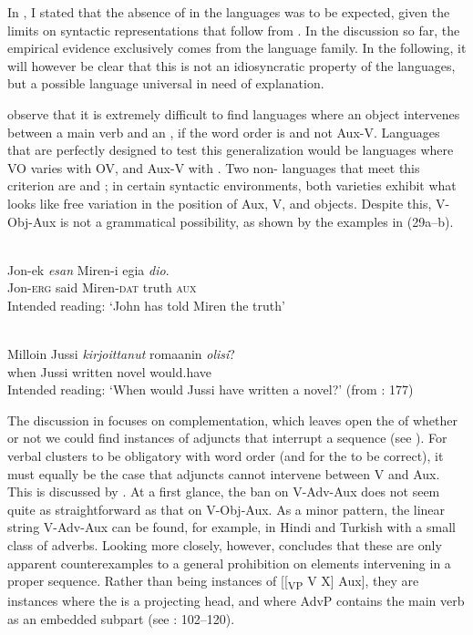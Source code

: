 \documentclass[output=paper, colorlinks, citecolor=brown]{langscibook}
\begin{document}
In , I stated that the absence of  in the  languages was to be expected, given the limits on syntactic representations that follow from . In the discussion so far, the empirical evidence exclusively comes from the  language family. In the following, it will however be clear that this is not an idiosyncratic property of the  languages, but a possible language universal in need of explanation.


\citet{BiberauerEtAl2014} observe that it is extremely difficult to find languages where an object intervenes between a main verb and an , if the word order is  and not Aux-V. Languages that are perfectly designed to test this generalization would be languages where VO varies with OV, and Aux-V with . Two non- languages that meet this criterion are  and ; in certain syntactic environments, both varieties exhibit what looks like free variation in the position of Aux, V, and objects. Despite this, V-Obj-Aux is not a grammatical possibility, as shown by the examples in (29a–b).


\ea
\label{ex:sangfelt:29}
\ea \ili{}\label{ex:sangfelt:29a}\\
\gll * Jon-ek \textit{esan} {Miren-i} {egia} \textit{dio}. \\
 {} Jon-\textsc{erg} said Miren-\textsc{dat} truth \textsc{aux}\\
\glt Intended reading: ‘John has told Miren the truth’

\ex {}\label{ex:sangfelt:29b}\\
\gll * Milloin Jussi \textit{kirjoittanut} {romaanin} \textit{olisi}? \\
 {} when Jussi written novel would.have\\
\glt Intended reading: ‘When would Jussi have written a novel?’ (from \citealt{BiberauerEtAl2014}: 177)\\
\z 
\z 


The discussion in \citet{BiberauerEtAl2014} focuses on complementation, which leaves open the  of whether or not we could find instances of adjuncts that interrupt a  sequence (see ). For verbal clusters to be obligatory with  word order (and for the  to be correct), it must equally be the case that adjuncts cannot intervene between V and Aux. This  is discussed by \citet{Sheehan2017Final}. At a first glance, the ban on V-Adv-Aux does not seem quite as straightforward as that on V-Obj-Aux. As a minor pattern, the linear string V-Adv-Aux can be found, for example, in Hindi and Turkish with a small class of adverbs. Looking more closely, however, \citet{Sheehan2017Final} concludes that these are only apparent counterexamples to a general prohibition on elements intervening in a proper  sequence. Rather than being instances of [[\textsubscript{VP} V X] Aux], they are instances where the  is a projecting head, and where AdvP contains the main verb as an embedded subpart (see \citealt{Sheehan2017Final}: 102–120).
\end{document}
